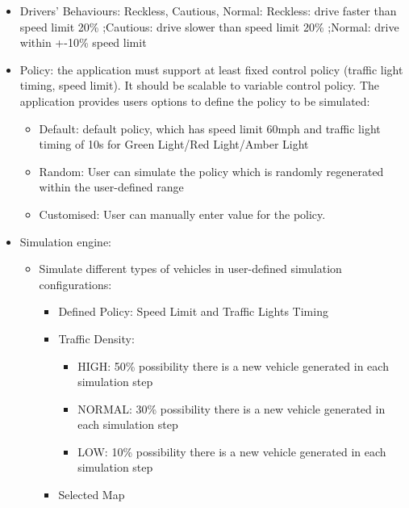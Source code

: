 \documentclass[11pt]{article}
\begin{document}
{\begin{itemize}
\begin{itemize}
        
        \item Drivers' Behaviours: Reckless, Cautious, Normal:
        Reckless: drive faster than speed limit 20\%
        ;Cautious: drive slower than speed limit 20\%
        ;Normal: drive within +-10\% speed limit
        
        \item Policy: the application must support at least fixed control policy (traffic light timing, speed limit). It should be scalable to variable control policy. The application provides users options to define the policy to be simulated:
            \begin{itemize}
                \item Default: default policy, which has speed limit 60mph and traffic light timing of 10s for Green Light/Red Light/Amber Light
                \item Random: User can simulate the policy which is randomly regenerated within the user-defined range
                \item Customised: User can manually enter value for the policy.
            \end{itemize}

        \item Simulation engine: 
        \begin{itemize}
        
        \item Simulate different types of vehicles in user-defined simulation configurations:
            \begin{itemize}
            \item Defined Policy: Speed Limit and Traffic Lights Timing
            \item Traffic Density:
                \begin{itemize}
                \item HIGH: 50\% possibility there is a new vehicle generated in each simulation step
                 \item NORMAL: 30\% possibility there is a new vehicle generated in each simulation step
                
                \item LOW: 10\% possibility there is a new vehicle generated in each simulation step
                \end{itemize}
            \item Selected Map
            
            
            \end{itemize}
        

\end{itemize}
\end{itemize}
\end{itemize}}
\end{document}
